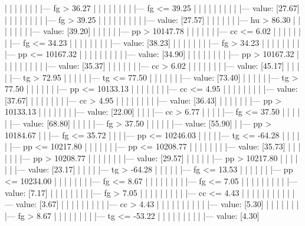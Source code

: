\documentclass[UTF8, a4paper]{ctexart}
\begin{document}
|   |   |   |   |   |   |   |--- fg >  36.27
|   |   |   |   |   |   |   |   |--- fg <= 39.25
|   |   |   |   |   |   |   |   |   |--- value: [27.67]
|   |   |   |   |   |   |   |   |--- fg >  39.25
|   |   |   |   |   |   |   |   |   |--- value: [27.57]
|   |   |   |   |   |   |--- hu >  86.30
|   |   |   |   |   |   |   |--- value: [39.20]
|   |   |   |   |   |--- pp >  10147.78
|   |   |   |   |   |   |--- cc <= 6.02
|   |   |   |   |   |   |   |--- fg <= 34.23
|   |   |   |   |   |   |   |   |--- value: [38.23]
|   |   |   |   |   |   |   |--- fg >  34.23
|   |   |   |   |   |   |   |   |--- pp <= 10167.32
|   |   |   |   |   |   |   |   |   |--- value: [34.90]
|   |   |   |   |   |   |   |   |--- pp >  10167.32
|   |   |   |   |   |   |   |   |   |--- value: [35.37]
|   |   |   |   |   |   |--- cc >  6.02
|   |   |   |   |   |   |   |--- value: [45.17]
|   |   |   |   |--- tg >  72.95
|   |   |   |   |   |--- tg <= 77.50
|   |   |   |   |   |   |--- value: [73.40]
|   |   |   |   |   |--- tg >  77.50
|   |   |   |   |   |   |--- pp <= 10133.13
|   |   |   |   |   |   |   |--- cc <= 4.95
|   |   |   |   |   |   |   |   |--- value: [37.67]
|   |   |   |   |   |   |   |--- cc >  4.95
|   |   |   |   |   |   |   |   |--- value: [36.43]
|   |   |   |   |   |   |--- pp >  10133.13
|   |   |   |   |   |   |   |--- value: [22.00]
|   |   |   |--- cc >  6.77
|   |   |   |   |--- fg <= 37.50
|   |   |   |   |   |--- value: [68.80]
|   |   |   |   |--- fg >  37.50
|   |   |   |   |   |--- value: [55.90]
|   |--- pp >  10184.67
|   |   |--- fg <= 35.72
|   |   |   |--- pp <= 10246.03
|   |   |   |   |--- tg <= -64.28
|   |   |   |   |   |--- pp <= 10217.80
|   |   |   |   |   |   |--- pp <= 10208.77
|   |   |   |   |   |   |   |--- value: [35.73]
|   |   |   |   |   |   |--- pp >  10208.77
|   |   |   |   |   |   |   |--- value: [29.57]
|   |   |   |   |   |--- pp >  10217.80
|   |   |   |   |   |   |--- value: [23.17]
|   |   |   |   |--- tg >  -64.28
|   |   |   |   |   |--- fg <= 13.53
|   |   |   |   |   |   |--- pp <= 10234.00
|   |   |   |   |   |   |   |--- fg <= 8.67
|   |   |   |   |   |   |   |   |--- fg <= 7.05
|   |   |   |   |   |   |   |   |   |--- value: [7.17]
|   |   |   |   |   |   |   |   |--- fg >  7.05
|   |   |   |   |   |   |   |   |   |--- cc <= 4.43
|   |   |   |   |   |   |   |   |   |   |--- value: [3.67]
|   |   |   |   |   |   |   |   |   |--- cc >  4.43
|   |   |   |   |   |   |   |   |   |   |--- value: [5.30]
|   |   |   |   |   |   |   |--- fg >  8.67
|   |   |   |   |   |   |   |   |--- tg <= -53.22
|   |   |   |   |   |   |   |   |   |--- value: [4.30]
\end{document}
